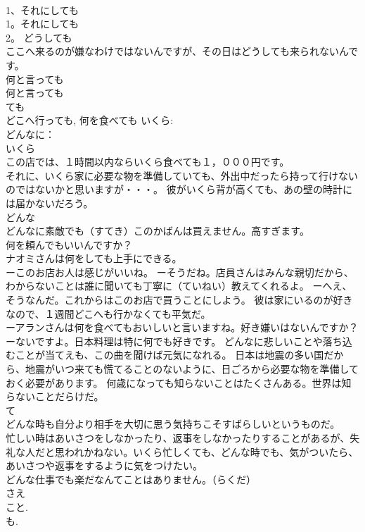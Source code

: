 \documentclass[8pt]{extreport}
\begin{document}
\begin{CJK}{UTF8}{min}
\\	1、それにしても
\\	1。それにしても
\\	2。 どうしても 
\\	ここへ来るのが嫌なわけではないんですが、その日はどうしても来られないんです。 
\\	何と言っても 
\\	何と言っても
\\	ても 
\\	どこへ行っても, 何を食べても いくら: 
\\	どんなに： 
\\	いくら 
\\	この店では、１時間以内ならいくら食べても１，０００円です。 
\\	それに、いくら家に必要な物を準備していても、外出中だったら持って行けないのではないかと思いますが・・・。 彼がいくら背が高くても、あの壁の時計には届かないだろう。 
\\	どんな 
\\	どんなに素敵でも（すてき）このかばんは買えません。高すぎます。 
\\	何を頼んでもいいんですか？ 
\\	ナオミさんは何をしても上手にできる。 
\\	ーこのお店お人は感じがいいね。 ーそうだね。店員さんはみんな親切だから、わからないことは誰に聞いても丁寧に（ていねい）教えてくれるよ。 ーへえ、そうなんだ。これからはこのお店で買うことにしよう。 彼は家にいるのが好きなので、１週間どこへも行かなくても平気だ。 
\\	ーアランさんは何を食べてもおいしいと言いますね。好き嫌いはないんですか？ ーないですよ。日本料理は特に何でも好きです。 どんなに悲しいことや落ち込むことが当てえも、この曲を聞けば元気になれる。 日本は地震の多い国だから、地震がいつ来ても慌てることのないように、日ごろから必要な物を準備しておく必要があります。 何歳になっても知らないことはたくさんある。世界は知らないことだらけだ。 
\\	て 
\\	どんな時も自分より相手を大切に思う気持ちこそすばらしいというものだ。 
\\	忙しい時はあいさつをしなかったり、返事をしなかったりすることがあるが、失礼な人だと思われかねない。いくら忙しくても、どんな時でも、気がついたら、あいさつや返事をするように気をつけたい。 
\\	どんな仕事でも楽だなんてことはありません。（らくだ） 
\\	さえ 
\\	こと. 
\\	も. 

\end{CJK}
\end{document}
